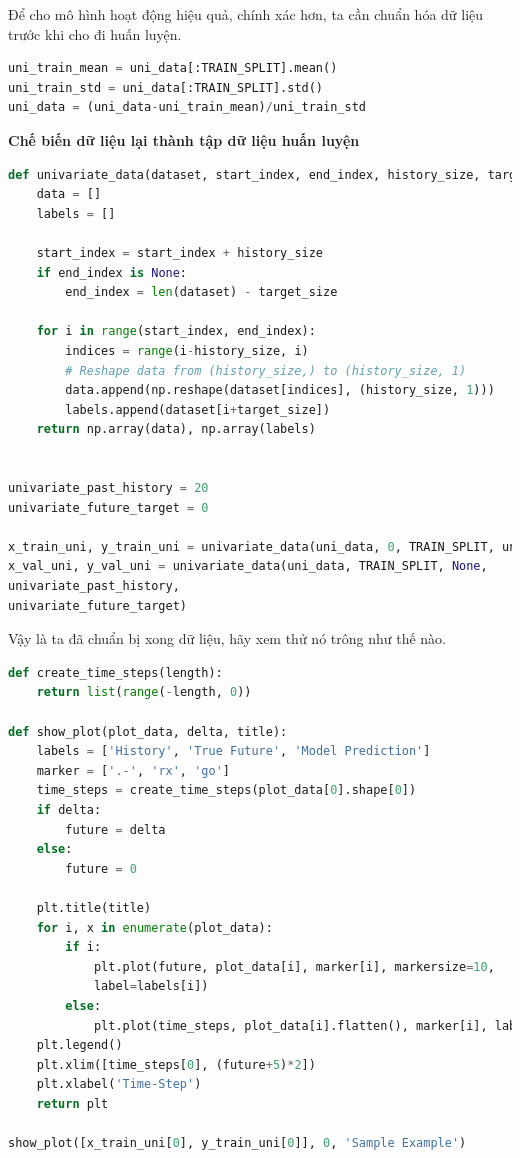 Để cho mô hình hoạt động hiệu quả, chính xác hơn, ta cần chuẩn hóa dữ liệu trước khi cho đi huấn luyện.


\begin{lstlisting}[language=Python]
uni_train_mean = uni_data[:TRAIN_SPLIT].mean()
uni_train_std = uni_data[:TRAIN_SPLIT].std()
uni_data = (uni_data-uni_train_mean)/uni_train_std
\end{lstlisting}


\vspace{0.25cm}
\changefontsizes{13pt}
\setlength{\parindent}{0cm}
\textbf{Chế biến dữ liệu lại thành tập dữ liệu huấn luyện}


\begin{lstlisting}[language=Python]
def univariate_data(dataset, start_index, end_index, history_size, target_size):
	data = []
	labels = []
	
	start_index = start_index + history_size
	if end_index is None:
		end_index = len(dataset) - target_size
	
	for i in range(start_index, end_index):
		indices = range(i-history_size, i)
		# Reshape data from (history_size,) to (history_size, 1)
		data.append(np.reshape(dataset[indices], (history_size, 1)))
		labels.append(dataset[i+target_size])
	return np.array(data), np.array(labels)
	

univariate_past_history = 20
univariate_future_target = 0

x_train_uni, y_train_uni = univariate_data(uni_data, 0, TRAIN_SPLIT, univariate_past_history, univariate_future_target)
x_val_uni, y_val_uni = univariate_data(uni_data, TRAIN_SPLIT, None,
univariate_past_history,
univariate_future_target)
\end{lstlisting}


Vậy là ta đã chuẩn bị xong dữ liệu, hãy xem thử nó trông như thế nào.


\begin{lstlisting}[language=Python]
def create_time_steps(length):
	return list(range(-length, 0))

def show_plot(plot_data, delta, title):
	labels = ['History', 'True Future', 'Model Prediction']
	marker = ['.-', 'rx', 'go']
	time_steps = create_time_steps(plot_data[0].shape[0])
	if delta:
		future = delta
	else:
		future = 0
	
	plt.title(title)
	for i, x in enumerate(plot_data):
		if i:
			plt.plot(future, plot_data[i], marker[i], markersize=10,
			label=labels[i])
		else:
			plt.plot(time_steps, plot_data[i].flatten(), marker[i], label=labels[i])
	plt.legend()
	plt.xlim([time_steps[0], (future+5)*2])
	plt.xlabel('Time-Step')
	return plt

show_plot([x_train_uni[0], y_train_uni[0]], 0, 'Sample Example')
\end{lstlisting}



